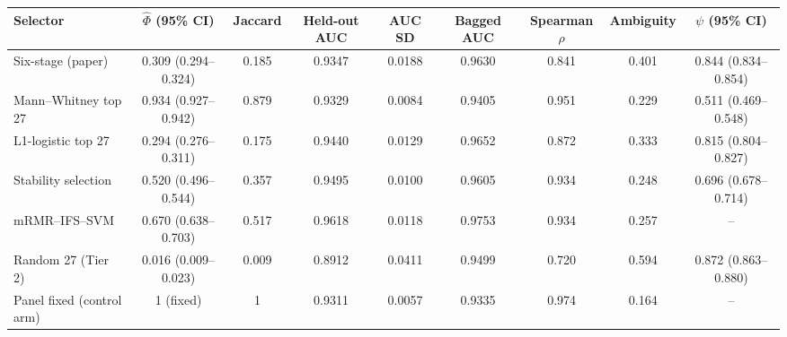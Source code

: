 \begin{tabular}{lcccccccc}
\toprule
Selector & $\hat\Phi$ (95\% CI) & Jaccard & Held-out AUC & AUC SD & Bagged AUC & Spearman $\rho$ & Ambiguity & $\psi$ (95\% CI) \\
\midrule
Six-stage (paper) & 0.309 (0.294--0.324) & 0.185 & 0.9347 & 0.0188 & 0.9630 & 0.841 & 0.401 & 0.844 (0.834--0.854) \\
Mann--Whitney top 27 & 0.934 (0.927--0.942) & 0.879 & 0.9329 & 0.0084 & 0.9405 & 0.951 & 0.229 & 0.511 (0.469--0.548) \\
L1-logistic top 27 & 0.294 (0.276--0.311) & 0.175 & 0.9440 & 0.0129 & 0.9652 & 0.872 & 0.333 & 0.815 (0.804--0.827) \\
Stability selection & 0.520 (0.496--0.544) & 0.357 & 0.9495 & 0.0100 & 0.9605 & 0.934 & 0.248 & 0.696 (0.678--0.714) \\
mRMR--IFS--SVM & 0.670 (0.638--0.703) & 0.517 & 0.9618 & 0.0118 & 0.9753 & 0.934 & 0.257 & -- \\
Random 27 (Tier 2) & 0.016 (0.009--0.023) & 0.009 & 0.8912 & 0.0411 & 0.9499 & 0.720 & 0.594 & 0.872 (0.863--0.880) \\
Panel fixed (control arm) & 1 (fixed) & 1 & 0.9311 & 0.0057 & 0.9335 & 0.974 & 0.164 & -- \\
\bottomrule
\end{tabular}
